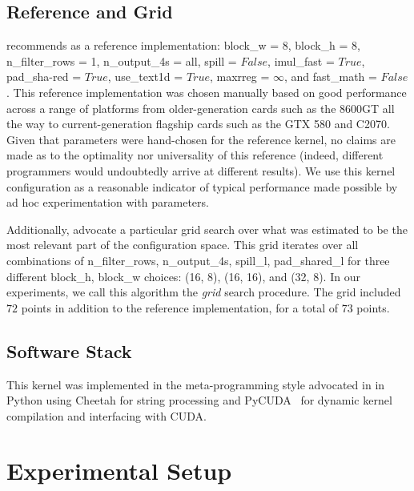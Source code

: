 \documentclass{sig-alternate}
\begin{document}
\subsection{Reference and Grid}
\label{sec:refgrid}

\cite{pinto+cox:2011gcg} recommends as a reference implementation:
block\_w = 8, 
block\_h = 8,
n\_filter\_rows = 1,
n\_output\_4s = all,
spill = $False$,
imul\_fast = $True$,
pad\_sha-red = $True$, %
use\_text1d = $True$,
maxrreg = $\infty$,
and fast\_math = $False$.
This reference implementation was chosen manually based on good performance
across a range of platforms from older-generation cards such as the 8600GT all
the way to current-generation flagship cards such as the GTX 580 and C2070.
Given that parameters were hand-chosen for the reference kernel, no claims are
made as to the optimality nor universality of this reference (indeed, different
programmers would undoubtedly arrive at different results).  We use
this kernel configuration as a reasonable indicator of typical performance
made possible by ad hoc experimentation with parameters.

Additionally, \cite{pinto+cox:2011gcg} advocate a particular grid search over
what was estimated to be the most relevant part of the configuration space.
This grid iterates over all
combinations of n\_filter\_rows, n\_output\_4s, spill\_l, pad\_shared\_l for three different block\_h, block\_w choices: (16, 8), (16, 16), and (32, 8).
In our experiments, we call this algorithm the {\em grid} search procedure.
The grid included $72$ points in addition to the reference implementation, for a total of $73$ points.

\subsection{Software Stack}

This kernel was implemented in the meta-programming style advocated in
\citet{pinto+cox:2011gcg} in Python using Cheetah for string
processing and PyCUDA~\citep{klockner2011pycuda} for dynamic
kernel compilation and interfacing with CUDA.


\section{Experimental Setup}
\label{sec:exp}
\end{document}
